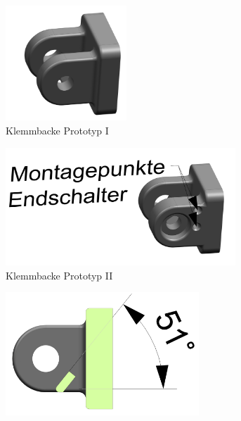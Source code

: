 \begin{figure}[H]
\centering
\begin{subfigure}{0.49\textwidth}
\centering
\includegraphics[width=0.5\textwidth]{assets/greifer-prototyp/Backe_alt_trimetrisch.png}
\caption{Klemmbacke Prototyp I}
\label{fig:jaw_old_trimetric}
\end{subfigure}
\begin{subfigure}{0.49\textwidth}
\centering
\includegraphics[width=0.95\textwidth]{assets/greifer-prototyp/Backe_neu_trimetrisch.png}
\caption{Klemmbacke Prototyp II}
\label{fig:jaw_new_trimetric}
\end{subfigure}
\begin{subfigure}{0.49\textwidth}
\centering
\includegraphics[width=0.8\textwidth]{assets/greifer-prototyp/Backe_alt_schnitt.png}

\end{subfigure}
\end{figure}
